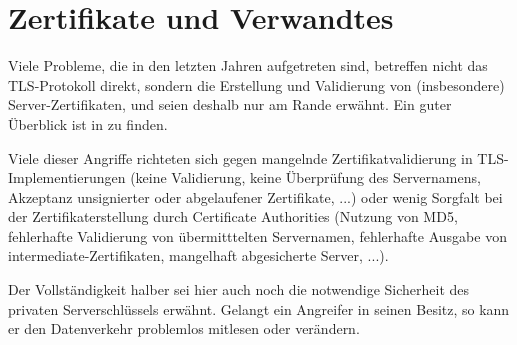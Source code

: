 \documentclass[
    12pt,
    headings=small,
    parskip=half,           %
    bibliography=totoc,
    numbers=noenddot,       %
    open=any,               %
   final                   %
    ]{scrreprt}
\begin{document}
\section{Zertifikate und Verwandtes}

Viele Probleme, die in den letzten Jahren aufgetreten sind, betreffen nicht das TLS-Protokoll direkt, sondern die Erstellung und Validierung von (insbesondere) Server-Zertifikaten, und seien deshalb nur am Rande erwähnt. Ein guter Überblick ist in \cite{meyer13} zu finden.

Viele dieser Angriffe richteten sich gegen mangelnde Zertifikatvalidierung in TLS-Implementierungen (keine Validierung, keine Überprüfung des Servernamens, Akzeptanz unsignierter oder abgelaufener Zertifikate, ...) oder wenig Sorgfalt bei der Zertifikaterstellung durch Certificate Authorities (Nutzung von MD5, fehlerhafte Validierung von übermitttelten Servernamen, fehlerhafte Ausgabe von intermediate-Zertifikaten, mangelhaft abgesicherte Server, ...).

Der Vollständigkeit halber sei hier auch noch die notwendige Sicherheit des privaten Serverschlüssels erwähnt. Gelangt ein Angreifer in seinen Besitz, so kann er den Datenverkehr problemlos mitlesen oder verändern.




\end{document}
